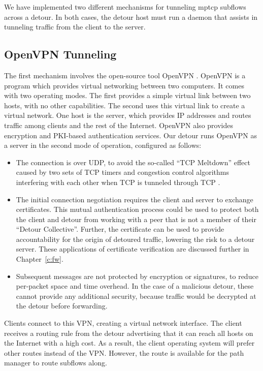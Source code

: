 \documentclass{cwru}
\begin{document}
We have implemented two different mechanisms for tunneling \ac{mptcp} subflows across
a detour. In both cases, the detour host must run a daemon that assists in
tunneling traffic from the client to the server.

\subsection{OpenVPN Tunneling}

The first mechanism involves the open-source tool OpenVPN
\cite{yonan2007openvpn}. OpenVPN is a program which provides virtual networking
between two computers. It comes with two operating modes. The first provides a
simple virtual link between two hosts, with no other capabilities. The second
uses this virtual link to create a virtual network. One host is the server,
which provides IP addresses and routes traffic among clients and the rest of the
Internet. OpenVPN also provides encryption and PKI-based authentication
services. Our detour runs OpenVPN as a server in the second mode of operation,
configured as follows:

\begin{itemize}
\item The connection is over UDP, to avoid the so-called ``TCP Meltdown'' effect
  caused by two sets of TCP timers and congestion control algorithms interfering
  with each other when TCP is tunneled through TCP \cite{khanvilkar2004virtual}.
\item The initial connection negotiation requires the client and server to
  exchange certificates. This mutual authentication process could be used to
  protect both the client and detour from working with a peer that is not a
  member of their ``Detour Collective''. Further, the certificate can be used to
  provide accountability for the origin of detoured traffic, lowering the risk
  to a detour server. These applications of certificate verification are
  discussed further in Chapter~\ref{c:fw}.
\item Subsequent messages are not protected by encryption or signatures, to
  reduce per-packet space and time overhead. In the case of a malicious detour,
  these cannot provide any additional security, because traffic would be
  decrypted at the detour before forwarding.
\end{itemize}

Clients connect to this VPN, creating a virtual network interface. The client
receives a routing rule from the detour advertising that it can reach all hosts
on the Internet with a high cost. As a result, the client operating system will
prefer other routes instead of the VPN. However, the route is available for the
path manager to route subflows along.
\end{document}
